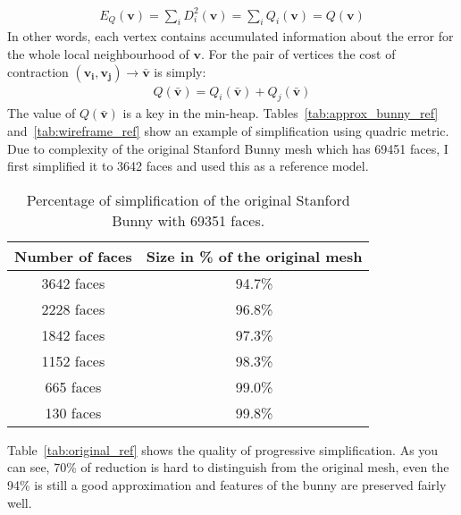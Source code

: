 \begin{align}
E_Q(\mathbf{v}) = \sum_{i} D_i^2(\mathbf{v}) = \sum_{i} Q_i(\mathbf{v}) = Q(\mathbf{v})
\end{align}
In other words, each vertex contains accumulated information about the error for the whole local neighbourhood of $\mathbf{v}$. For the pair of vertices the cost of contraction $(\mathbf{v_i}, \mathbf{v_j})\rightarrow\bar{\mathbf{v}}$ is simply:
\begin{align}
Q(\mathbf{\bar{v}}) = Q_i(\mathbf{\bar{v}}) + Q_j(\mathbf{\bar{v}})
\end{align}
The value of $Q(\mathbf{\bar{v}})$ is a key in the min-heap. Tables~\ref{tab:approx_bunny_ref} and~\ref{tab:wireframe_ref} show an example of simplification using quadric metric. Due to complexity of the original Stanford Bunny mesh which has 69451 faces, I first simplified it to 3642 faces and used this as a reference model.

\begin{table}[h!]
\centering
\begin{tabular}{ |c|c| } 
 \hline
 Number of faces & Size in \% of the original mesh\\
 \hline
 3642 faces & 94.7\% \\ 
 2228 faces & 96.8\% \\ 
 1842 faces & 97.3\%\\ 
 1152 faces & 98.3\%\\ 
 665 faces & 99.0\%\\ 
 130 faces & 99.8\%\\
 \hline
\end{tabular}
\caption{Percentage of simplification of the original Stanford Bunny with 69351 faces.}
\end{table}
Table~\ref{tab:original_ref} shows the quality of progressive simplification. As you can see, 70\% of reduction is hard to distinguish from the original mesh, even the 94\% is still a good approximation and features of the bunny are preserved fairly well.

